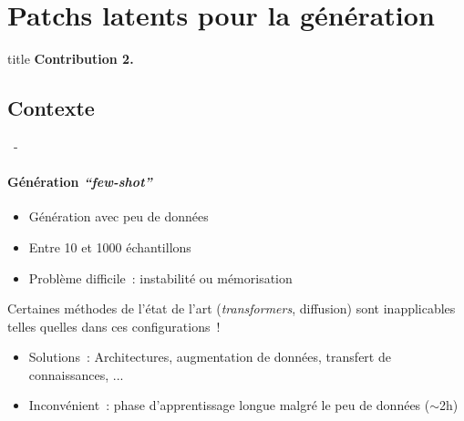 \documentclass[aspectratio=169, 22pt]{beamer}
\begin{document}
\section{Patchs latents pour la génération}
\begin{frame}
  \begin{beamercolorbox}[sep=15pt,center,shadow=true,rounded=true]{title}
    \LARGE\bfseries Contribution 2.\\ \secname
  \end{beamercolorbox}
\end{frame}

\subsection{Contexte}
\begin{frame}{\secname~- \subsecname}
  \framesubtitle{Génération \emph{``few-shot''}}
  \begin{itemize}
  \item Génération avec peu de données
  \item Entre 10 et 1000 échantillons
  \item Problème difficile : instabilité ou mémorisation
  \end{itemize}
  \begin{customblock}{}
    \centering
    Certaines méthodes de l'état de l'art (\emph{transformers},
    diffusion) sont \alert{inapplicables} telles quelles dans ces
    configurations !
  \end{customblock}
  \pause
  \begin{itemize}
  \item Solutions : Architectures, augmentation de données, transfert de connaissances, ...
  \item \alert{Inconvénient} : phase d'apprentissage longue malgré le peu de données ($\sim$2h)
  \end{itemize}

  
\end{frame}
\end{document}

